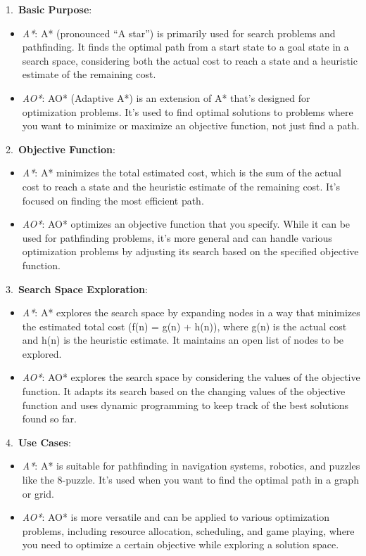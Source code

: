 \documentclass{article}
\begin{document}
\begin{enumerate}
    1.\ \textbf{Basic Purpose}:
    \begin{itemize}
        \item \textit{A*}: A* (pronounced ``A star'') is primarily used for search problems and pathfinding. It finds the optimal path from a start state to a goal state in a search space, considering both the actual cost to reach a state and a heuristic estimate of the remaining cost.
        \item \textit{AO*}: AO* (Adaptive A*) is an extension of A* that's designed for optimization problems. It's used to find optimal solutions to problems where you want to minimize or maximize an objective function, not just find a path.
    \end{itemize}
    
    2.\ \textbf{Objective Function}:
    \begin{itemize}
        \item \textit{A*}: A* minimizes the total estimated cost, which is the sum of the actual cost to reach a state and the heuristic estimate of the remaining cost. It's focused on finding the most efficient path.
        \item \textit{AO*}: AO* optimizes an objective function that you specify. While it can be used for pathfinding problems, it's more general and can handle various optimization problems by adjusting its search based on the specified objective function.
    \end{itemize}
    
    3.\ \textbf{Search Space Exploration}:
    \begin{itemize}
        \item \textit{A*}: A* explores the search space by expanding nodes in a way that minimizes the estimated total cost (f(n) = g(n) + h(n)), where g(n) is the actual cost and h(n) is the heuristic estimate. It maintains an open list of nodes to be explored.
        \item \textit{AO*}: AO* explores the search space by considering the values of the objective function. It adapts its search based on the changing values of the objective function and uses dynamic programming to keep track of the best solutions found so far.
    \end{itemize}
    
    4.\ \textbf{Use Cases}:
    \begin{itemize}
        \item \textit{A*}: A* is suitable for pathfinding in navigation systems, robotics, and puzzles like the 8-puzzle. It's used when you want to find the optimal path in a graph or grid.
        \item \textit{AO*}: AO* is more versatile and can be applied to various optimization problems, including resource allocation, scheduling, and game playing, where you need to optimize a certain objective while exploring a solution space.
    \end{itemize}
    

\end{enumerate}
\end{document}

